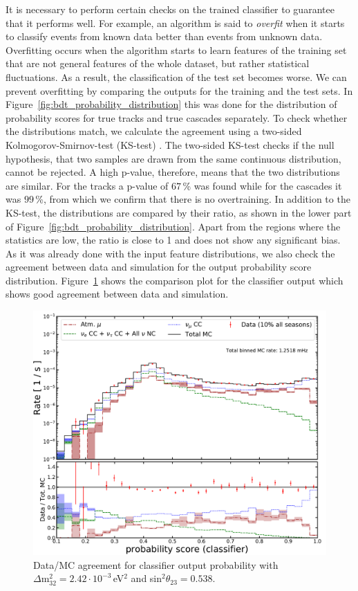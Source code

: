 It is necessary to perform certain checks on the trained classifier to guarantee that it performs well.
For example, an algorithm is said to \textit{overfit} when it starts to classify events from known data better than events from unknown data.
Overfitting occurs when the algorithm starts to learn features of the training set that are not general features of the whole dataset, but rather statistical fluctuations.
As a result, the classification of the test set becomes worse.
We can prevent overfitting by comparing the outputs for the training and the test sets.
In Figure~\ref{fig:bdt_probability_distribution} this was done for the distribution of probability scores for true tracks and true cascades separately.
To check whether the distributions match, we calculate the agreement using a two-sided Kolmogorov-Smirnov-test (KS-test) \cite{10010480527}.
The two-sided KS-test checks if the null hypothesis, that two samples are drawn from the same continuous distribution, cannot be rejected.
A high p-value, therefore, means that the two distributions are similar.
For the tracks a p-value of $67$\,\% was found while for the cascades it was $99$\,\%, from which we confirm that there is no overtraining.
In addition to the KS-test, the distributions are compared by their ratio, as shown in the lower part of Figure~\ref{fig:bdt_probability_distribution}.
Apart from the regions where the statistics are low, the ratio is close to 1 and does not show any significant bias.
As it was already done with the input feature distributions, we also check the agreement between data and simulation for the output probability score distribution.
Figure~\ref{fig:bdt_data_mc} shows the comparison plot for the classifier output which shows good agreement between data and simulation.

\begin{figure}[hb]
    \centering
    \includegraphics[width=0.9\linewidth]{figures/bdt_score_14.pdf}
    \caption[Data/MC agreement for classifier output probability]{Data/MC agreement for classifier output probability with $\Delta\mathrm{m}^2_{32}=2.42\cdot10^{-3}$\,eV$^2$ and sin$^2\theta_{23}=0.538$.}
    \label{fig:bdt_data_mc}
\end{figure}

